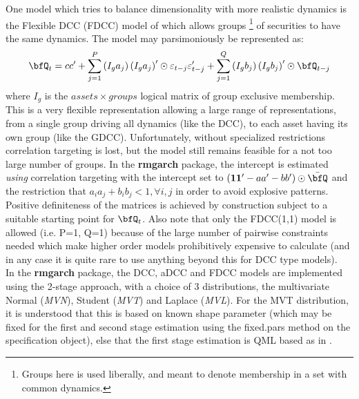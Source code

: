 One model which tries to balance dimensionality with more realistic dynamics is the Flexible DCC (FDCC)
model of \cite{Billio2006} which allows groups \footnote{Groups here is used liberally,
and meant to denote membership in a set with common dynamics.} of securities to have the same
dynamics. The model may parsimoniously be represented as:
\begin{equation}\label{eq:fdcc}
{\bfQ_t} = cc' + \sum\limits_{j = 1}^P {\left( {{I_g}{a_j}} \right){{\left( {{I_g}{a_j}} \right)}^\prime } \odot {\varepsilon _{t - j}}} {\varepsilon '_{t - j}} + \sum\limits_{j = 1}^Q {\left( {{I_g}{b_j}} \right){{\left( {{I_g}{b_j}} \right)}^\prime } \odot {\bfQ_{t - j}}}
\end{equation}
where $I_g$ is the $assets\times groups$ logical matrix of group exclusive membership. This is
a very flexible representation allowing a large range of representations, from a single group
driving all dynamics (like the DCC), to each asset having its own group (like the GDCC).
Unfortunately, without specialized restrictions correlation targeting is lost, but the model
still remains feasible for a not too large number of groups. In the {\bf rmgarch} package,
the intercept is estimated \emph{using} correlation targeting with the intercept set to
$({\mathbf{11'}} - aa' - bb')\odot \bar \bfQ$ and the restriction that $a_i a_j+b_i b_j<1,\forall i,j$
in order to avoid explosive patterns. Positive definiteness of the matrices is achieved by
construction subject to a suitable starting point for $\bfQ_t$. Also note that only the
FDCC(1,1) model is allowed (i.e. P=1, Q=1) because of the large number of pairwise constraints
needed which make higher order models prohibitively expensive to calculate (and in any case it is
quite rare to use anything beyond this for DCC type models).\\
In the {\bf rmgarch} package, the DCC, aDCC and FDCC models are implemented using the
2-stage approach, with a choice of 3 distributions, the multivariate Normal (\emph{MVN}),
Student (\emph{MVT}) and Laplace (\emph{MVL}). For the MVT distribution, it is
understood that this is based on known shape parameter (which may be fixed for
the first and second stage estimation using the fixed.pars method on the
specification object), else that the first stage estimation is QML based as in
\cite{Bauwens2005}.\\

